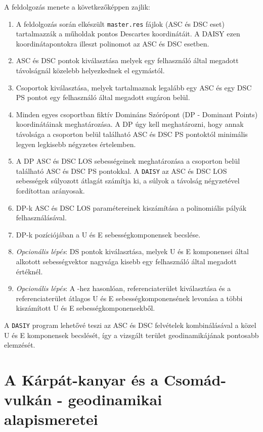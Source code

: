 \documentclass[12pt]{report}
\numberwithin{equation}{section}
\numberwithin{table}{section}
\numberwithin{figure}{section}
\begin{document}
A feldolgozás menete a következőképpen zajlik:
\begin{enumerate}
    \item A \stamps feldolgozás során elkészült \texttt{master.res} fájlok (ASC és DSC eset) tartalmazzák a műholdak pontos Descartes koordinátáit. A DAISY ezen koordinátapontokra illeszt polinomot az ASC és DSC esetben.
    \item ASC és DSC pontok kiválasztása melyek egy felhasználó által megadott távolságnál közelebb helyezkednek el egymástól.
    \item Csoportok kiválasztása, melyek tartalmaznak legalább egy ASC és egy DSC PS pontot egy felhasználó által megadott sugáron belül.
    \item Minden egyes csoportban fiktív Domináns Szórópont (DP - Dominant Points) koordinátáinak meghatározása. A DP úgy kell meghatározni, hogy annak távolsága a csoporton belül található ASC és DSC PS pontoktól minimális legyen legkisebb négyzetes értelemben.
    \item A DP ASC és DSC LOS sebességeinek meghatározása a csoporton belül található ASC és DSC PS pontokkal. A \texttt{DAISY} az ASC és DSC LOS sebességek súlyozott átlagát számítja ki, a súlyok a távolság négyzetével fordítottan arányosak.
    \item DP-k ASC és DSC LOS paramétereinek kiszámítása a polinomiális pályák felhasználásával.
    \item DP-k pozíciójában a U és E sebességkomponensek becslése.
    \item \textit{Opcionális lépés}: DS pontok kiválasztása, melyek U és E komponensei által alkotott sebességvektor nagysága kisebb egy felhasználó által megadott értéknél.
    \item \textit{Opcionális lépés}: A \stamps-hez hasonlóan, referenciaterület kiválasztása és a referenciaterület átlagos U és E sebességkomponensének levonása a többi kiszámított U és E sebességkomponensekből.
\end{enumerate}

A \texttt{DASIY} program lehetővé teszi az ASC és DSC felvételek kombinálásával a közel U és E komponensek becslését, így a vizsgált terület geodinamikájának pontosabb elemzését.

\chapter{A Kárpát-kanyar és a Csomád-vulkán - geodinamikai alapismeretei}
\end{document}
